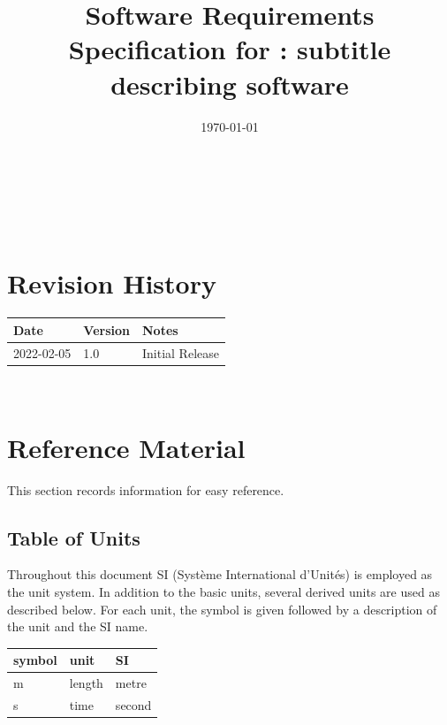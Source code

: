 \documentclass[12pt]{article}
\begin{document}
\title{Software Requirements Specification for \progname: subtitle describing software} 
\author{\authname}
\date{\today}
	
\maketitle

~\newpage


\tableofcontents

~\newpage

\section*{Revision History}

\begin{tabularx}{\textwidth}{p{3cm}p{2cm}X}
\toprule {\bf Date} & {\bf Version} & {\bf Notes}\\
\midrule
2022-02-05 & 1.0 & Initial Release\\
\bottomrule
\end{tabularx}
~\newpage

\section{Reference Material}

This section records information for easy reference.

\subsection{Table of Units}

Throughout this document SI (Syst\`{e}me International d'Unit\'{e}s) is employed
as the unit system.  In addition to the basic units, several derived units are
used as described below.  For each unit, the symbol is given followed by a
description of the unit and the SI name.
~\newline

\renewcommand{\arraystretch}{1.2}
  \noindent \begin{tabular}{l l l} 
    \toprule		
    \textbf{symbol} & \textbf{unit} & \textbf{SI}\\
    \midrule 
    \si{\metre} & length & metre\\
    \si{\second} & time & second\\
    \bottomrule
  \end{tabular}
\end{document}

